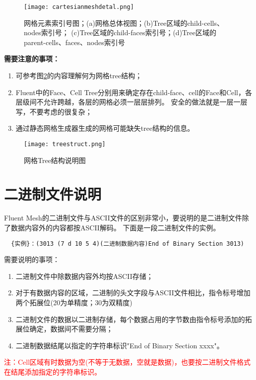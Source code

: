 \documentclass[lang=cn,11pt,a4paper]{elegantpaper} %
\begin{document}
\begin{figure}[!htb]
  \centering
  \texttt{[image: cartesianmeshdetal.png]}
  \caption{网格元素索引号图；(a)网格总体视图；(b)Tree区域的child-cells、nodes索引号；
                          (c)Tree区域的child-faces索引号；(d)Tree区域的parent-cells、faces、nodes索引号}
  \label{cartesianmeshdetal}
\end{figure}

\textbf{需要注意的事项：}
\begin{enumerate}
  \item 可参考图\ref{treestruct}的内容理解何为网格tree结构；
  \item Fluent中的Face、Cell Tree分别用来确定存在child-face、cell的Face和Cell，各层级间不允许跨越，各层的网格必须一层层排列。
        安全的做法就是一层一层写，不要考虑的很复杂；
  \item 通过静态网格生成器生成的网格可能缺失tree结构的信息。
\end{enumerate}

\begin{figure}[!htb]
  \centering
  \texttt{[image: treestruct.png]}
  \caption{网格Tree结构说明图}
  \label{treestruct}
\end{figure}

\section{二进制文件说明}

Fluent Mesh的二进制文件与ASCII文件的区别非常小，要说明的是二进制文件除了数据内容外的内容都按ASCII解码。
下面是一段二进制文件的实例。

\begin{lstlisting}
  {实例}：(3013 (7 d 10 5 4)(二进制数据内容)End of Binary Section 3013)
\end{lstlisting}

需要说明的事项：
\begin{enumerate}
  \item 二进制文件中除数据内容外均按ASCII存储；
  \item 对于有数据内容的区域，二进制的头文字段与ASCII文件相比，指令标号增加两个拓展位(20为单精度；30为双精度)
  \item 二进制文件的数据以二进制存储，每个数据占用的字节数由指令标号添加的拓展位确定，数据间不需要分隔；
  \item 二进制数据结尾以指定的字符串标识"End of Binary Section xxxx"。
\end{enumerate}
\textcolor{red}{注：Cell区域有时数据为空(不等于无数据，空就是数据)，也要按二进制文件格式在结尾添加指定的字符串标识。}
\end{document}
